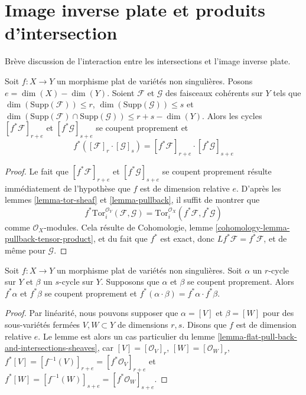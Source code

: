 \section{Image inverse plate et produits d'intersection}
\label{section-flat-pullback-and-intersection-products}

\noindent
Brève discussion de l'interaction entre les intersections et
l'image inverse plate.

\begin{lemma}
\label{lemma-flat-pull-back-and-intersections-sheaves}
Soit $f : X \to Y$ un morphisme plat de variétés non singulières. Posons
$e = \dim(X) - \dim(Y)$. Soient $\mathcal{F}$ et $\mathcal{G}$ des faisceaux
cohérents sur $Y$ tels que $\dim(\text{Supp}(\mathcal{F})) \leq r$,
$\dim(\text{Supp}(\mathcal{G})) \leq s$ et
$\dim(\text{Supp}(\mathcal{F}) \cap \text{Supp}(\mathcal{G}) )
\leq r + s - \dim(Y)$. Alors les cycles
$[f^*\mathcal{F}]_{r + e}$ et $[f^*\mathcal{G}]_{s + e}$
se coupent proprement et
$$
f^*([\mathcal{F}]_r \cdot [\mathcal{G}]_s) =
[f^*\mathcal{F}]_{r + e} \cdot [f^*\mathcal{G}]_{s + e}
$$
\end{lemma}

\begin{proof}
Le fait que $[f^*\mathcal{F}]_{r + e}$ et $[f^*\mathcal{G}]_{s + e}$
se coupent proprement résulte immédiatement de l'hypothèse que $f$ est de
dimension relative $e$. D'après les
lemmes \ref{lemma-tor-sheaf} et \ref{lemma-pullback},
il suffit de montrer que
$$
f^*\text{Tor}_i^{\mathcal{O}_Y}(\mathcal{F}, \mathcal{G}) =
\text{Tor}_i^{\mathcal{O}_X}(f^*\mathcal{F}, f^*\mathcal{G})
$$
comme $\mathcal{O}_X$-modules. Cela résulte de
Cohomologie, lemme \ref{cohomology-lemma-pullback-tensor-product},
et du fait que $f^*$ est exact, donc $Lf^*\mathcal{F} = f^*\mathcal{F}$,
et de même pour $\mathcal{G}$.
\end{proof}

\begin{lemma}
\label{lemma-flat-pullback-and-intersections}
Soit $f : X \to Y$ un morphisme plat de variétés non singulières.
Soit $\alpha$ un $r$-cycle sur $Y$ et $\beta$ un $s$-cycle sur $Y$.
Supposons que $\alpha$ et $\beta$ se coupent proprement. Alors $f^*\alpha$
et $f^*\beta$ se coupent proprement et
$f^*( \alpha \cdot \beta ) = f^*\alpha \cdot f^*\beta$.
\end{lemma}

\begin{proof}
Par linéarité, nous pouvons supposer que $\alpha = [V]$ et $\beta = [W]$
pour des sous-variétés fermées $V, W \subset Y$ de dimensions $r, s$.
Disons que $f$ est de dimension relative $e$. Le lemme est alors un cas particulier du
lemme \ref{lemma-flat-pull-back-and-intersections-sheaves},
car $[V] = [\mathcal{O}_V]_r$, $[W] = [\mathcal{O}_W]_r$,
$f^*[V] = [f^{-1}(V)]_{r + e} = [f^*\mathcal{O}_V]_{r + e}$ et
$f^*[W] = [f^{-1}(W)]_{s + e} = [f^*\mathcal{O}_W]_{s + e}$.
\end{proof}


